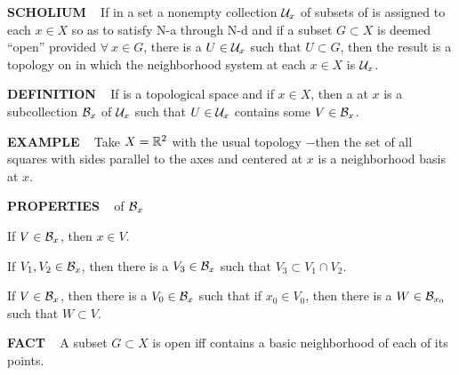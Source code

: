 \vspace{0.1cm}

\begin{x}{\small\bf SCHOLIUM} \ %
If in a set \mX a nonempty collection $\mathcal{U}_x$ of subsets of \mX is assigned to each $x \in X$ 
so as to satisfy N-a through N-d and if a subset $G \subset X$ is deemed ``open'' provided 
$\forall \ x \in G$, there is a $U \in \mathcal{U}_x$ such that $U \subset G$, then the result is a topology on \mX 
in which the neighborhood system at each $x \in X$ is $\mathcal{U}_x$.
\end{x}

\vspace{0.1cm}

\begin{x}{\small\bf DEFINITION} \ %
If \mX is a topological space and if $x \in X$, then a 
at $x$ is a subcollection $\mathcal{B}_x$ of $\mathcal{U}_x$ such that $U \in \mathcal{U}_x$ contains some $V \in \mathcal{B}_x$.
\end{x}

\vspace{0.1cm}

\begin{x}{\small\bf EXAMPLE} \ %
Take $X = \mathbb{R}^2$ with the usual topology $-$then the set of all squares with sides parallel to the axes and centered at $x$ 
is a neighborhood basis at $x$.
\end{x}

\vspace{0.1cm}

\begin{x}{\small\bf PROPERTIES} \ %
of $\mathcal{B}_x$

\vspace{0.1cm}

 \quad If $V \in \mathcal{B}_x$, then $x \in V$.

 \quad If $V_1, V_2 \in \mathcal{B}_x$, then there is a $V_3 \in \mathcal{B}_x$ such that $V_3 \subset V_1 \cap V_2$.

 \quad If $V \in \mathcal{B}_x$, then there is a $V_0 \in \mathcal{B}_x$ such that if $x_0 \in V_0$, then there is a 
$W \in \mathcal{B}_{x_0}$ such that $W \subset V$.
\end{x}

\vspace{0.1cm}

\begin{x}{\small\bf FACT} \ %
A subset $G \subset X$ is open iff \mG contains a basic neighborhood of each of its points.
\end{x}

